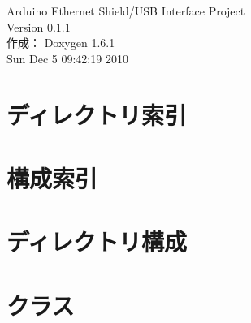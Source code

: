 \documentclass[a4paper]{book}
\begin{document}
\hypersetup{pageanchor=false}
\begin{titlepage}
\vspace*{7cm}
\begin{center}
{\Large Arduino Ethernet Shield/USB Interface Project \\[1ex]\large Version 0.1.1 }\\
\vspace*{1cm}
{\large 作成： Doxygen 1.6.1}\\
\vspace*{0.5cm}
{\small Sun Dec 5 09:42:19 2010}\\
\end{center}
\end{titlepage}
\clearemptydoublepage
{}
\tableofcontents
\clearemptydoublepage
{}
\hypersetup{pageanchor=true}
\chapter{ディレクトリ索引}

\chapter{構成索引}

\chapter{ディレクトリ構成}




\chapter{クラス}


\printindex
\end{document}
